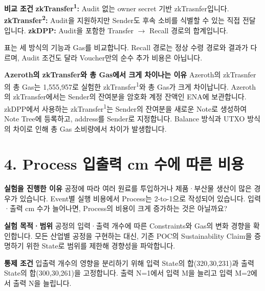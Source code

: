 \documentclass[11pt,a4paper]{article}
\begin{document}
\textbf{비교 조건}\newline
\textbf{zkTransfer\textsuperscript{1}:} Audit 없는 owner secret 기반 zkTrasnfer입니다.\newline
\textbf{zkTransfer\textsuperscript{2}:} Audit을 지원하지만 Sender도 후속 소비를 식별할 수 있는 직접 전달입니다.\newline
\textbf{zkDPP:} Audit을 포함한 Transfer $\rightarrow$ Recall 경로의 합계입니다.

표는 세 방식의 기능과 Gas를 비교합니다.\newline
Recall 경로는 정상 수령 경로와 결과가 다르며, Audit 조건도 달라 Voucher만의 순수 추가 비용은 아닙니다.



\textbf{Azeroth의 zkTransfer와 총 Gas에서 크게 차이나는 이유}\newline
Azeroth의 zkTrasnfer의 총 Gas는 1,555,957로 실험한 zkTransfer\textsuperscript{1}와 총 Gas가 크게 차이납니다.\newline
Azeroth의 zkTransfer에서는 Sender의 잔여분을 암호화 계정 잔액인 ENA에 보관합니다.\newline
zkDPP에서 사용하는 zkTransfer\textsuperscript{1}는 Sender의 잔여분을 새로운 Note로 생성하여 Note Tree에 등록하고, address를 Sender로 지정합니다.
Balance 방식과 UTXO 방식의 차이로 인해 총 Gas 소비량에서 차이가 발생합니다.\newline

\clearpage
{}\section*{4. Process 입출력 cm 수에 따른 비용}
\textbf{실험을 진행한 이유}\newline
공정에 따라 여러 원료를 투입하거나 제품·부산물 생산이 많은 경우가 있습니다. Event별 실행 비용에서 Process는 2-to-1으로 작성되어 있습니다.\newline
입력·출력 cm 수가 늘어나면, Process의 비용이 크게 증가하는 것은 아닐까요?

\textbf{실험 목적·범위}\newline
공정의 입력·출력 개수에 따른 Constraints와 Gas의 변화 경향을 확인합니다.\newline
모든 산업별 공정을 구현하는 대신, 기존 POC의 Sustainability Claim을 증명하기 위한 State로 범위를 제한해 경향성을 파악합니다.

\textbf{통제 조건}\newline
입출력 개수의 영향을 분리하기 위해 입력 State의 합(320,30,231)과 출력 State의 합(300,30,261)을 고정합니다.\newline
출력 N=1에서 입력 M을 늘리고 입력 M=2에서 출력 N을 늘립니다.
\end{document}
